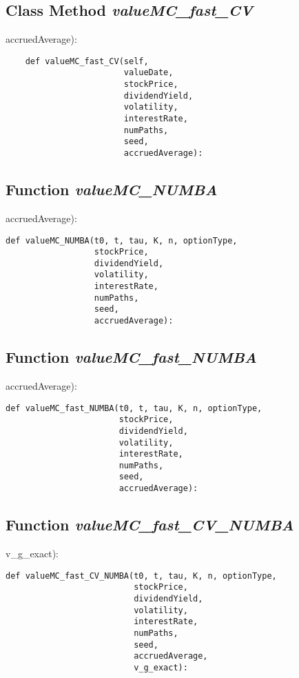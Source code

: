 \documentclass[twoside,11pt]{book}
\begin{document}
\subsection{Class Method {\it valueMC\_fast\_CV}}
accruedAverage):

\begin{lstlisting}
    def valueMC_fast_CV(self,
                        valueDate,
                        stockPrice,
                        dividendYield,
                        volatility,
                        interestRate,
                        numPaths,
                        seed,
                        accruedAverage):
\end{lstlisting}

\subsection{Function {\it valueMC\_NUMBA}}
accruedAverage):

\begin{lstlisting}
def valueMC_NUMBA(t0, t, tau, K, n, optionType,
                  stockPrice,
                  dividendYield,
                  volatility,
                  interestRate,
                  numPaths,
                  seed,
                  accruedAverage):
\end{lstlisting}

\subsection{Function {\it valueMC\_fast\_NUMBA}}
accruedAverage):

\begin{lstlisting}
def valueMC_fast_NUMBA(t0, t, tau, K, n, optionType,
                       stockPrice,
                       dividendYield,
                       volatility,
                       interestRate,
                       numPaths,
                       seed,
                       accruedAverage):
\end{lstlisting}

\subsection{Function {\it valueMC\_fast\_CV\_NUMBA}}
v\_g\_exact):

\begin{lstlisting}
def valueMC_fast_CV_NUMBA(t0, t, tau, K, n, optionType,
                          stockPrice,
                          dividendYield,
                          volatility,
                          interestRate,
                          numPaths,
                          seed,
                          accruedAverage,
                          v_g_exact):
\end{lstlisting}
\end{document}
